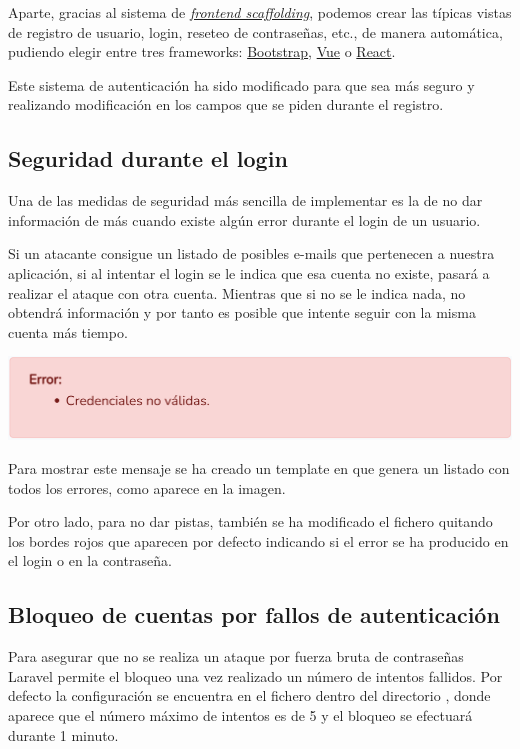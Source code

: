 \documentclass{\ClassPath/viu-tfm-template}
\begin{document}
Aparte, gracias al sistema de \textit{\href{https://laravel.com/docs/6.x/frontend}{frontend scaffolding}}, podemos crear las típicas vistas de registro de usuario, login, reseteo de contraseñas, etc., de manera automática, pudiendo elegir entre tres frameworks: \href{https://getbootstrap.com/}{Bootstrap}, \href{https://vuejs.org/}{Vue} o \href{https://es.reactjs.org/}{React}.

Este sistema de autenticación ha sido modificado para que sea más seguro y realizando modificación en los campos que se piden durante el registro.


\subsection{Seguridad durante el login}
Una de las medidas de seguridad más sencilla de implementar es la de no dar información de más cuando existe algún error durante el login de un usuario.

Si un atacante consigue un listado de posibles e-mails que pertenecen a nuestra aplicación, si al intentar el login se le indica que esa cuenta no existe, pasará a realizar el ataque con otra cuenta. Mientras que si no se le indica nada, no obtendrá información y por tanto es posible que intente seguir con la misma cuenta más tiempo.

\begin{center}
    \includegraphics[width=0.8\linewidth]{img/error_simple.png}
\end{center}

Para mostrar este mensaje se ha creado un template en  que genera un listado con todos los errores, como aparece en la imagen.

Por otro lado, para no dar pistas, también se ha modificado el fichero  quitando los bordes rojos que aparecen por defecto indicando si el error se ha producido en el login o en la contraseña.


\subsection{Bloqueo de cuentas por fallos de autenticación}
Para asegurar que no se realiza un ataque por fuerza bruta  de contraseñas  Laravel permite el bloqueo una vez realizado un número de intentos fallidos. Por defecto la configuración se encuentra en el fichero  dentro del directorio , donde aparece que el número máximo de intentos es de 5 y el bloqueo se efectuará durante 1 minuto.
\end{document}
